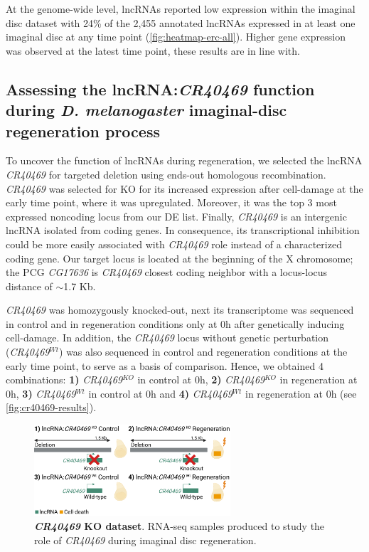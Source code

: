 At the genome-wide level, lncRNAs reported low expression within the imaginal disc dataset with 24\% of the 2,455 annotated lncRNAs expressed in at least one imaginal disc at any time point (\autoref{fig:heatmap-erc-all}). Higher gene expression was observed at the latest time point, these results are in line with.\autocite{chen_2016_lncRNA}

\clearpage

\subsection{Assessing the lncRNA:\textit{CR40469} function during \textit{D. melanogaster} imaginal-disc regeneration process}
\label{sec:results-cr40469}

To uncover the function of lncRNAs during regeneration, we selected the lncRNA \textit{CR40469} for targeted deletion using ends-out homologous recombination.\autocite{baena_2013} \textit{CR40469} was selected for KO for its increased expression after cell-damage at the early time point, where it was upregulated. Moreover, it was the top 3 most expressed noncoding locus from our DE list. Finally, \textit{CR40469} is an intergenic lncRNA isolated from coding genes. In consequence, its transcriptional inhibition could be more easily associated with \textit{CR40469} role instead of a characterized coding gene. Our target locus is located at the beginning of the X chromosome; the PCG \textit{CG17636} is \textit{CR40469} closest coding neighbor with a locus-locus distance of $\sim$1.7 Kb.  

\textit{CR40469} was homozygously knocked-out, next its transcriptome was sequenced in control and in regeneration conditions only at 0h after genetically inducing cell-damage. In addition, the \textit{CR40469} locus without genetic perturbation (\textit{CR40469}$^{Wt}$) was also sequenced in control and regeneration conditions at the early time point, to serve as a basis of comparison. Hence, we obtained 4 combinations: \textbf{1)} \textit{CR40469}$^{KO}$ in control at 0h, \textbf{2)} \textit{CR40469}$^{KO}$ in regeneration at 0h, \textbf{3)} \textit{CR40469}$^{Wt}$ in control at 0h and \textbf{4)} \textit{CR40469}$^{Wt}$ in regeneration at 0h (see \autoref{fig:cr40469-results}).


\begin{figure}[!htb]
  \centering
  \includegraphics[width=0.65\textwidth]{img/results/dme/CR40469-KO-results.png}
  \caption[\textit{CR40469} KO dataset]{\textbf{\textit{CR40469} KO dataset}. RNA-seq samples produced to study the role of \textit{CR40469} during imaginal disc regeneration.}
  \label{fig:cr40469-results}
\end{figure}

